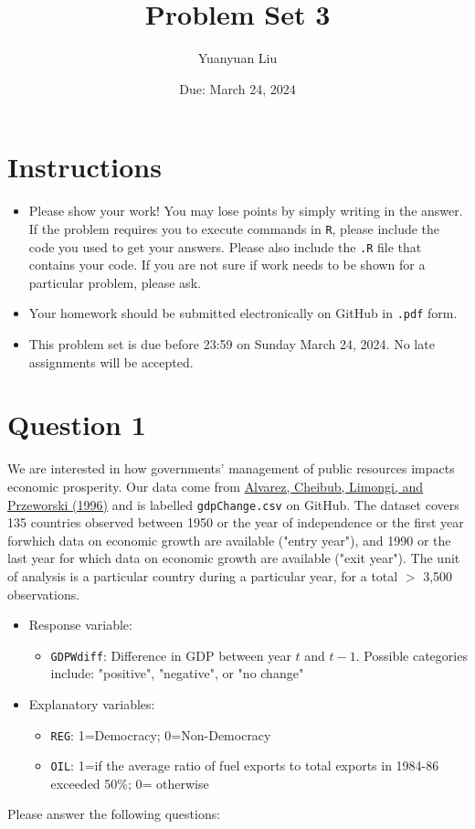\documentclass[12pt,letterpaper]{article}
\title{Problem Set 3}
\date{Due: March 24, 2024}
\author{Yuanyuan Liu}
\begin{document}
	\maketitle
	\section*{Instructions}
	\begin{itemize}
	\item Please show your work! You may lose points by simply writing in the answer. If the problem requires you to execute commands in \texttt{R}, please include the code you used to get your answers. Please also include the \texttt{.R} file that contains your code. If you are not sure if work needs to be shown for a particular problem, please ask.
\item Your homework should be submitted electronically on GitHub in \texttt{.pdf} form.
\item This problem set is due before 23:59 on Sunday March 24, 2024. No late assignments will be accepted.
	\end{itemize}

	\vspace{.25cm}
\section*{Question 1}
\vspace{.25cm}
\noindent We are interested in how governments' management of public resources impacts economic prosperity. Our data come from \href{https://www.researchgate.net/profile/Adam_Przeworski/publication/240357392_Classifying_Political_Regimes/links/0deec532194849aefa000000/Classifying-Political-Regimes.pdf}{Alvarez, Cheibub, Limongi, and Przeworski (1996)} and is labelled \texttt{gdpChange.csv} on GitHub. The dataset covers 135 countries observed between 1950 or the year of independence or the first year forwhich data on economic growth are available ("entry year"), and 1990 or the last year for which data on economic growth are available ("exit year"). The unit of analysis is a particular country during a particular year, for a total $>$ 3,500 observations. 

\begin{itemize}
	\item
	Response variable: 
	\begin{itemize}
		\item \texttt{GDPWdiff}: Difference in GDP between year $t$ and $t-1$. Possible categories include: "positive", "negative", or "no change"
	\end{itemize}
	\item
	Explanatory variables: 
	\begin{itemize}
		\item
		\texttt{REG}: 1=Democracy; 0=Non-Democracy
		\item
		\texttt{OIL}: 1=if the average ratio of fuel exports to total exports in 1984-86 exceeded 50\%; 0= otherwise
	\end{itemize}
	
\end{itemize}
\newpage
\noindent Please answer the following questions:
\end{document}
